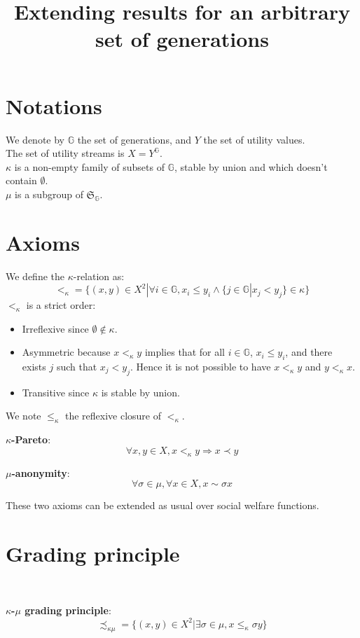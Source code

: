 \documentclass{article}
\title{Extending results for an arbitrary set of generations}
\author{}
\newcommand{\G}{\mathbb{G}}
\begin{document}
\maketitle

\section{Notations}

We denote by $\G$ the set of generations, and $Y$ the set of utility values.\\
The set of utility streams is $X=Y^\G$.\\
$\kappa$ is a non-empty family of subsets of $\G$, stable by union and which doesn't
contain $\emptyset$.\\
$\mu$ is a subgroup of $\mathfrak{S}_\G$.

\section{Axioms}

We define the $\kappa$-relation as:
\[<_\kappa = \{(x,y)\in X^2|\forall i\in \G, x_i \leq y_i \land
\{j \in \G | x_j < y_j\}\in\kappa\}\]
$<_\kappa$ is a strict order:
\begin{itemize}
  \item Irreflexive since $\emptyset\not\in\kappa$.
  \item Asymmetric because $x<_\kappa y$ implies that for all $i\in\G$,
        $x_i\leq y_i$, and there exists $j$ such that $x_j < y_j$. Hence
        it is not possible to have $x<_\kappa y$ and $y<_\kappa x$.
  \item Transitive since $\kappa$ is stable by union.
\end{itemize}
We note $\leq_\kappa$ the reflexive closure of $<_\kappa$.\smallskip\par

\textbf{$\kappa$-Pareto}:
\[\forall x,y\in X, x <_\kappa y \Rightarrow x \prec y\]

\textbf{$\mu$-anonymity}:
\[\forall\sigma\in\mu,\forall x\in X, x \sim \sigma x\]

These two axioms can be extended as usual over social welfare functions.

\section{Grading principle}
\ \par
\textbf{$\kappa$-$\mu$ grading principle}:
\[\precsim_{\kappa\mu} = \{(x,y)\in X^2 |
\exists\sigma\in\mu, x \leq_\kappa \sigma y\}\]
\end{document}
